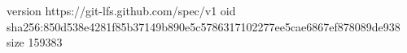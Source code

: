 version https://git-lfs.github.com/spec/v1
oid sha256:850d538e4281f85b37149b890e5c5786317102277ee5cae6867ef878089de938
size 159383
